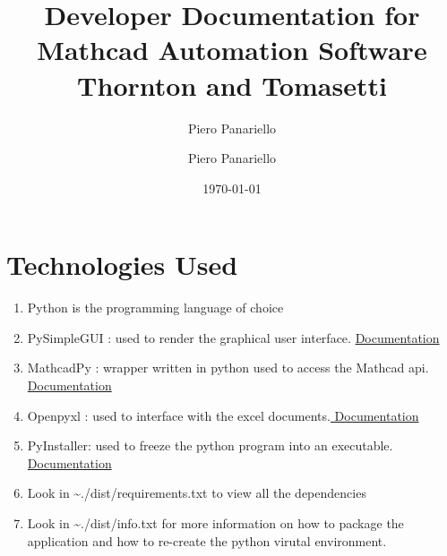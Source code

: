 \documentclass[11pt]{article}
\author{Piero Panariello}
\author{Piero Panariello}
\date{\today}
\title{Developer Documentation for Mathcad Automation Software\\\medskip
\large Thornton and Tomasetti}
\begin{document}
\maketitle
\tableofcontents


\section{Technologies Used}
\label{sec:orgedc3a64}
\begin{enumerate}
\item Python is the programming language of choice
\item PySimpleGUI : used to render the graphical user interface. \href{https://pysimplegui.readthedocs.io/en/latest/}{Documentation}
\item MathcadPy : wrapper written in python used to access the Mathcad api. \href{https://github.com/MattWoodhead/MathcadPy/blob/master/MathcadPy/\_application.py}{Documentation}
\item Openpyxl : used to interface with the excel documents.\href{https://openpyxl.readthedocs.io/en/stable/}{ Documentation}
\item PyInstaller: used to freeze the python program into an executable.\href{https://pyinstaller.readthedocs.io/en/stable/}{ Documentation}
\item Look in \textasciitilde{}./dist/requirements.txt to view all the dependencies
\item Look in \textasciitilde{}./dist/info.txt for more information on how to package the application and how to re-create the python virutal environment.
\end{enumerate}
\end{document}
